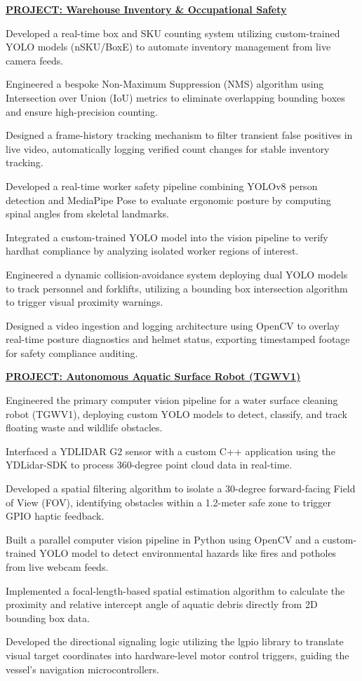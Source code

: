 \documentclass[letterpaper,11pt]{article}
\newcommand{\resumeItem}[1]{
  \item\small{
    {#1 \vspace{-2pt}}
  }
}
\begin{document}
        \vspace{4pt}
        \resumeItem{\textbf{\underline{PROJECT: Warehouse Inventory \& Occupational Safety}}}
        \resumeItem{Developed a real-time box and SKU counting system utilizing custom-trained YOLO models (nSKU/BoxE) to automate inventory management from live camera feeds.}
        \resumeItem{Engineered a bespoke Non-Maximum Suppression (NMS) algorithm using Intersection over Union (IoU) metrics to eliminate overlapping bounding boxes and ensure high-precision counting.}
        \resumeItem{Designed a frame-history tracking mechanism to filter transient false positives in live video, automatically logging verified count changes for stable inventory tracking.}
        \resumeItem{Developed a real-time worker safety pipeline combining YOLOv8 person detection and MediaPipe Pose to evaluate ergonomic posture by computing spinal angles from skeletal landmarks.}
        \resumeItem{Integrated a custom-trained YOLO model into the vision pipeline to verify hardhat compliance by analyzing isolated worker regions of interest.}
        \resumeItem{Engineered a dynamic collision-avoidance system deploying dual YOLO models to track personnel and forklifts, utilizing a bounding box intersection algorithm to trigger visual proximity warnings.}
        \resumeItem{Designed a video ingestion and logging architecture using OpenCV to overlay real-time posture diagnostics and helmet status, exporting timestamped footage for safety compliance auditing.}

        \vspace{4pt}
        \resumeItem{\textbf{\underline{PROJECT: Autonomous Aquatic Surface Robot (TGWV1)}}}
        \resumeItem{Engineered the primary computer vision pipeline for a water surface cleaning robot (TGWV1), deploying custom YOLO models to detect, classify, and track floating waste and wildlife obstacles.}
        \resumeItem{Interfaced a YDLIDAR G2 sensor with a custom C++ application using the YDLidar-SDK to process 360-degree point cloud data in real-time.}
        \resumeItem{Developed a spatial filtering algorithm to isolate a 30-degree forward-facing Field of View (FOV), identifying obstacles within a 1.2-meter safe zone to trigger GPIO haptic feedback.}
        \resumeItem{Built a parallel computer vision pipeline in Python using OpenCV and a custom-trained YOLO model to detect environmental hazards like fires and potholes from live webcam feeds.}
        \resumeItem{Implemented a focal-length-based spatial estimation algorithm to calculate the proximity and relative intercept angle of aquatic debris directly from 2D bounding box data.}
        \resumeItem{Developed the directional signaling logic utilizing the lgpio library to translate visual target coordinates into hardware-level motor control triggers, guiding the vessel's navigation microcontrollers.}
\end{document}
